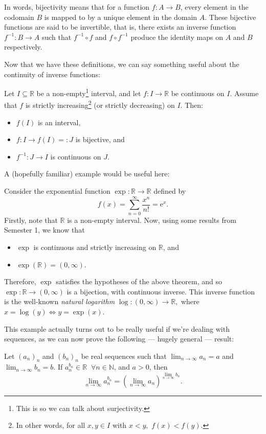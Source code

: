 \documentclass[
  10pt,
  a4paper]{article}
\providecommand{\tightlist}{%
  \setlength{\itemsep}{0pt}\setlength{\parskip}{0pt}}
\theoremstyle{plain}
\theoremstyle{definition}
\theoremstyle{plain}
\theoremstyle{plain}
\theoremstyle{plain}
\theoremstyle{plain}
\theoremstyle{definition}
\theoremstyle{definition}
\theoremstyle{remark}
\theoremstyle{remark}
\let\BeginKnitrBlock\begin \let\EndKnitrBlock\end
\begin{document}
In words, bijectivity means that for a function \(f:A \to B\), every element in the codomain \(B\) is mapped to by a unique element in the domain \(A\). These bijective functions are said to be invertible, that is, there exists an inverse function \(f^{-1}: B \to A\) such that \(f^{-1} \circ f\) and \(f \circ f^{-1}\) produce the identity maps on \(A\) and \(B\) respectively.

Now that we have these definitions, we can say something useful about the continuity of inverse functions:

\BeginKnitrBlock{theorem}
{\label{thm:thm1} }Let \(I \subseteq \mathbb{R}\) be a non-empty\footnote{This is so we can talk about surjectivity.} interval, and let \(f: I \to \mathbb{R}\) be continuous on \(I\). Assume that \(f\) is strictly increasing\footnote{In other words, for all \(x,y \in I\) with \(x < y,\) \(f(x) < f(y)\).} (or strictly decreasing) on \(I\). Then:

\begin{itemize}
\tightlist
\item
  \(f(I)\) is an interval,
\item
  \(f : I \to f(I) =: J\) is bijective, and
\item
  \(f^{-1}: J \to I\) is continuous on \(J\).
\end{itemize}
\EndKnitrBlock{theorem}

A (hopefully familiar) example would be useful here:

\BeginKnitrBlock{example}
{\label{exm:unnamed-chunk-2} }Consider the exponential function \(\exp:\mathbb{R} \to \mathbb{R}\) defined by \[f(x)  = \sum_{n = 0}^{\infty} \frac{x^n}{n!} = \mathrm{e}^x.\] Firstly, note that \(\mathbb{R}\) is a non-empty interval. Now, using some results from Semester 1, we know that

\begin{itemize}
\tightlist
\item
  \(\exp\) is continuous and strictly increasing on \(\mathbb{R}\), and
\item
  \(\exp(\mathbb{R}) = (0,\infty)\).
\end{itemize}

Therefore, \(\exp\) satisfies the hypotheses of the above theorem, and so \(\exp: \mathbb{R} \to (0, \infty)\) is a bijection, with continuous inverse. This inverse function is the well-known \emph{natural logarithm} \(\log: (0,\infty) \to \mathbb{R},\) where \(x = \log(y) \iff y = \exp(x).\)
\EndKnitrBlock{example}

This example actually turns out to be really useful if we're dealing with sequences, as we can now prove the following --- hugely general --- result:
\BeginKnitrBlock{proposition}
{\label{prp:prop1} }Let \((a_n)_n\) and \((b_n)_n\) be real sequences such that \(\lim_{n\to\infty}a_n = a\) and \(\lim_{n\to\infty}b_n = b\). If \(a_n^{b_n} \in \mathbb{R}\;\; \forall n \in \mathbb{N}\), and \(a>0\), then \[\lim_{n \to \infty} a_n^{b_n} = \left(\lim_{n\to\infty} a_n\right)^{\lim_{n\to\infty}b_n}.\]
\EndKnitrBlock{proposition}
\end{document}
